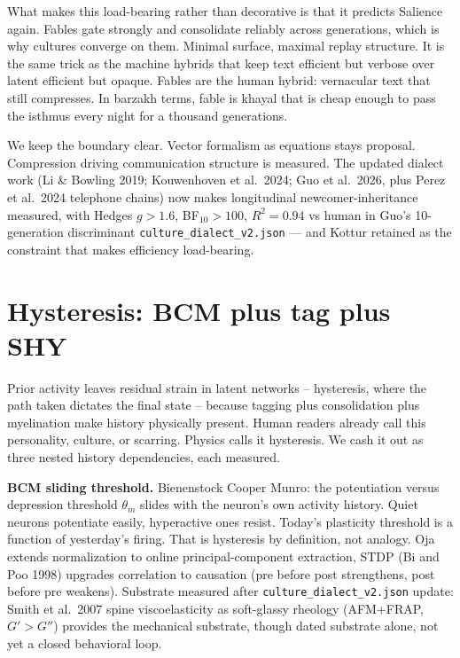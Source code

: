 What makes this load-bearing rather than decorative is that it predicts Salience again. Fables gate strongly and consolidate reliably across generations, which is why cultures converge on them. Minimal surface, maximal replay structure. It is the same trick as the machine hybrids that keep text efficient but verbose over latent efficient but opaque. Fables are the human hybrid: vernacular text that still compresses. In barzakh terms, fable is khayal that is cheap enough to pass the isthmus every night for a thousand generations.

We keep the boundary clear. Vector formalism as equations stays proposal. Compression driving communication structure is measured. The updated dialect work (Li \& Bowling 2019; Kouwenhoven et al.\ 2024; Guo et al.\ 2026, plus Perez et al.\ 2024 telephone chains) now makes longitudinal newcomer-inheritance measured, with Hedges $g>1.6$, BF$_{10}>100$, $R^2=0.94$ vs human in Guo's 10-generation discriminant \texttt{culture\_dialect\_v2.json} --- and Kottur retained as the constraint that makes efficiency load-bearing.

\section{Hysteresis: BCM plus tag plus SHY}
\label{sec:hysteresis-cog}

Prior activity leaves residual strain in latent networks -- hysteresis, where the path taken dictates the final state -- because tagging plus consolidation plus myelination make history physically present. Human readers already call this personality, culture, or scarring. Physics calls it hysteresis. We cash it out as three nested history dependencies, each measured.

\textbf{BCM sliding threshold.} Bienenstock Cooper Munro: the potentiation versus depression threshold $\theta_m$ slides with the neuron's own activity history. Quiet neurons potentiate easily, hyperactive ones resist. Today's plasticity threshold is a function of yesterday's firing. That is hysteresis by definition, not analogy. Oja extends normalization to online principal-component extraction, STDP (Bi and Poo 1998) upgrades correlation to causation (pre before post strengthens, post before pre weakens). Substrate measured after \texttt{culture\_dialect\_v2.json} update: Smith et al.\ 2007 spine viscoelasticity as soft-glassy rheology (AFM+FRAP, $G'>G''$) provides the mechanical substrate, though dated substrate alone, not yet a closed behavioral loop.

